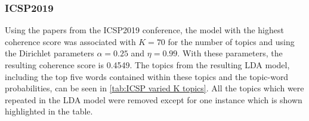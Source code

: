 \documentclass[a4paper, 12pt, twoside]{article}
\numberwithin{equation}{section} %
\begin{document}
\begin{table}[h]
\centering
{}
\caption[Document-topic probabilities matrix example]{Subset of document-topic probabilities $\theta_{d,k}$ for TSL2018.}
\label{tab:TSL2018 theta matrix}
\end{table}



\subsubsection{ICSP2019}

Using the papers from the ICSP2019 conference, the model with the highest coherence score was associated with $K = 70$ for the number of topics and using the Dirichlet parameters $\alpha = 0.25$ and $\eta = 0.99$. With these parameters, the resulting coherence score is 0.4549. The topics from the resulting LDA model, including the top five words contained within these topics and the topic-word probabilities, can be seen in \ref{tab:ICSP varied K topics}. All the topics which were repeated in the LDA model were removed except for one instance which is shown highlighted in the table. 
\end{document}
